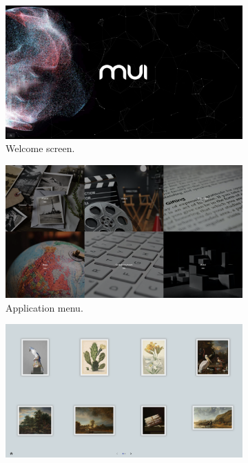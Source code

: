     \begin{figure}[ht]
        \centering
        \vspace{-10pt}
        \begin{subfigure}{.32\textwidth}
            \centering
            \includegraphics[width=.96\linewidth]{Figures/LUI/UI/welcome_screen_lui.pdf}  
            \vspace{-5pt}
            \captionsetup{width=.9\linewidth}
            \caption{Welcome screen.}
            \label{fig:lui:screenshots:welcome-screen}
        \end{subfigure}
        \begin{subfigure}{.32\textwidth}
            \centering
            \includegraphics[width=.96\linewidth]{Figures/LUI/UI/app_menu.pdf}  
            \vspace{-5pt}
            \captionsetup{width=.9\linewidth}
            \caption{Application menu.}
            \label{fig:lui:screenshots:app-menu}
        \end{subfigure}
        \begin{subfigure}{.32\textwidth}
            \centering
            \includegraphics[width=.96\linewidth]{Figures/LUI/UI/photos-list.pdf}  

\end{subfigure}
\end{figure}
